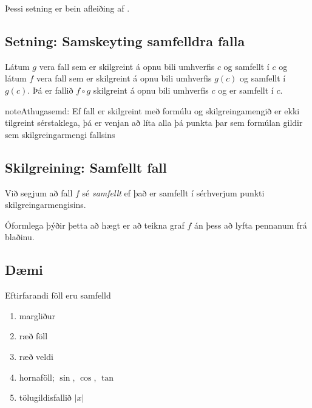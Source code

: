 \documentclass[b5paper,11pt,icelandic]{sphinxmanual}
\begin{document}
Þessi setning er bein afleiðing af {\hyperref[kafli02:setning\string-markgildi]{}}.


\subsection{Setning: Samskeyting samfelldra falla}
\label{kafli02:setning-samskeyting-samfelldra-falla}
Látum \(g\) vera fall sem er skilgreint á opnu bili umhverfis
\(c\) og samfellt í \(c\) og látum \(f\) vera fall sem er
skilgreint á opnu bili umhverfis \(g(c)\) og samfellt í
\(g(c)\). Þá er fallið \(f\circ g\) skilgreint á opnu bili
umhverfis \(c\) og er samfellt í \(c\).

\begin{notice}{note}{Athugasemd:}
Ef fall er skilgreint með formúlu og skilgreingamengið er ekki tilgreint
sérstaklega, þá er venjan að líta alla þá punkta þar sem formúlan gildir
sem skilgreingarmengi fallsins
\end{notice}


\subsection{Skilgreining: Samfellt fall}
\label{kafli02:index-9}\label{kafli02:skilgrsamfellt}\label{kafli02:skilgreining-samfellt-fall}
Við segjum að fall \(f\) sé \textit{samfellt} ef það er samfellt í
sérhverjum punkti skilgreingarmengisins.

Óformlega þýðir þetta að hægt er að teikna graf \(f\) án þess að lyfta pennanum frá blaðinu.


\subsection{Dæmi}
\label{kafli02:id13}
Eftirfarandi föll eru samfelld
\begin{enumerate}
\item {} 
margliður

\item {} 
ræð föll

\item {} 
ræð veldi

\item {} 
hornaföll; \(\sin\), \(\cos\), \(\tan\)

\item {} 
tölugildisfallið \(|x|\)

\end{enumerate}
\end{document}
